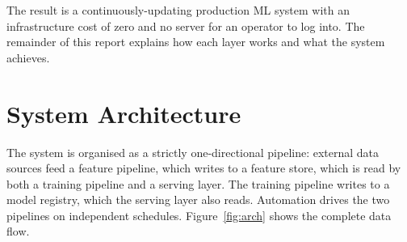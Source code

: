 \documentclass[11pt,a4paper]{article}
\begin{document}
The result is a continuously-updating production ML system with an
infrastructure cost of zero and no server for an operator to log into. The
remainder of this report explains how each layer works and what the system
achieves.

\section{System Architecture}

The system is organised as a strictly one-directional pipeline: external data
sources feed a feature pipeline, which writes to a feature store, which is read
by both a training pipeline and a serving layer. The training pipeline writes
to a model registry, which the serving layer also reads. Automation drives the
two pipelines on independent schedules. Figure~\ref{fig:arch} shows the
complete data flow.
\end{document}

